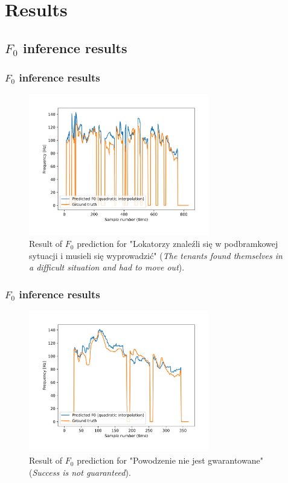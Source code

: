 \documentclass[a4paper,9pt]{beamer}
\theoremstyle{mytheoremstyle}
\begin{document}
\section{Results}

\subsection{$F_{0}$ inference results}

\begin{frame}
\frametitle{$F_{0}$ inference results}
\begin{figure}
\begin{center}
  \includegraphics[width=0.7\textwidth]{res/amu_pl_ilo_BAZA_2006A_zbitki_A0025_simple_pred_freq}
\end{center}
	\caption{Result of $F_0$ prediction for "Lokatorzy znale\'zli si\k{e} w podbramkowej sytuacji i musieli si\k{e} wyprowadzi\'c" (\textit{The tenants found themselves in a difficult situation and had to move out}).}
\end{figure}
\end{frame}

\begin{frame}
\frametitle{$F_{0}$ inference results}
\begin{figure}
\begin{center}
  \includegraphics[width=0.7\textwidth]{res/amu_pl_ilo_BAZA_2006C_C0545_simple_pred_freq}
\end{center}
	\caption{Result of $F_0$ prediction for "Powodzenie nie jest gwarantowane" (\textit{Success is not guaranteed}).}
\end{figure}
\end{frame}
\end{document}
